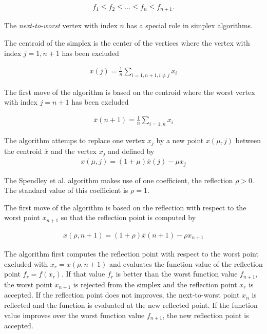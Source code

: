 \begin{eqnarray}
\label{sorted-vertices-fv}
f_1 \leq f_2 \leq \ldots \leq f_n \leq f_{n+1}.
\end{eqnarray}

The \emph{next-to-worst} vertex with index $n$ has a 
special role in simplex algorithms.

The centroid of the simplex is the center of the vertices
where the vertex with index $j=1,n+1$ has been 
excluded 

\begin{eqnarray}
\label{centroid-generalized}
\overline{x} (j) = \frac{1}{n} \sum_{i=1,n+1, i\neq j}x_i
\end{eqnarray}

The first move of the algorithm is based on the centroid 
where the worst vertex with index $j=n+1$ has been excluded 

\begin{eqnarray}
\label{centroid-worst}
\overline{x} (n+1) = \frac{1}{n} \sum_{i=1,n}x_i
\end{eqnarray}

The algorithm attemps to replace one vertex 
$x_j$ by a new point $x(\mu,j)$ between the centroid 
$\overline{x}$ and the vertex $x_j$ and defined by 
\begin{eqnarray}
\label{interpolate-generalized}
x(\mu,j) = (1+\mu)\overline{x}(j) - \mu x_j
\end{eqnarray}

The Spendley et al. \cite{Spendley1962} algorithm makes use
of one coefficient, the reflection $\rho>0$. The standard
value of this coefficient is $\rho=1$.

The first move of the algorithm is based on the reflection
with respect to the worst point $x_{n+1}$ so that the reflection point is 
computed by 

\begin{eqnarray}
\label{interpolate-worst}
x(\rho,n+1) = (1+\rho)\overline{x}(n+1) - \rho x_{n+1}
\end{eqnarray}

The algorithm first computes the reflection point 
with respect to the worst point excluded with $x_r=x(\rho,n+1)$
and evaluates the function value of the reflection
point $f_r=f(x_r)$. If that value $f_r$ is better than the worst function
value $f_{n+1}$, the worst point $x_{n+1}$ is rejected from the 
simplex and the reflection point $x_r$ is accepted. If the reflection point 
does not improves, the next-to-worst point $x_n$ is reflected and the 
function is evaluated at the new reflected point. If the function
value improves over the worst function value $f_{n+1}$, the new reflection point is 
accepted.

